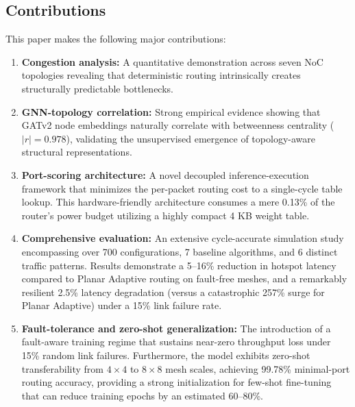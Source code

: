 \subsection{Contributions}

This paper makes the following major contributions:

\begin{enumerate}
    \item \textbf{Congestion analysis:} A quantitative demonstration across seven NoC topologies revealing that deterministic routing intrinsically creates structurally predictable bottlenecks.

    \item \textbf{GNN-topology correlation:} Strong empirical evidence showing that GATv2 node embeddings naturally correlate with betweenness centrality ($|r| = 0.978$), validating the unsupervised emergence of topology-aware structural representations.

    \item \textbf{Port-scoring architecture:} A novel decoupled inference-execution framework that minimizes the per-packet routing cost to a single-cycle table lookup. This hardware-friendly architecture consumes a mere 0.13\% of the router's power budget utilizing a highly compact 4 KB weight table.

    \item \textbf{Comprehensive evaluation:} An extensive cycle-accurate simulation study encompassing over 700 configurations, 7 baseline algorithms, and 6 distinct traffic patterns. Results demonstrate a 5--16\% reduction in hotspot latency compared to Planar Adaptive routing on fault-free meshes, and a remarkably resilient 2.5\% latency degradation (versus a catastrophic 257\% surge for Planar Adaptive) under a 15\% link failure rate.

    \item \textbf{Fault-tolerance and zero-shot generalization:} The introduction of a fault-aware training regime that sustains near-zero throughput loss under 15\% random link failures. Furthermore, the model exhibits zero-shot transferability from $4\times4$ to $8\times8$ mesh scales, achieving 99.78\% minimal-port routing accuracy, providing a strong initialization for few-shot fine-tuning that can reduce training epochs by an estimated 60--80\%.
\end{enumerate}
